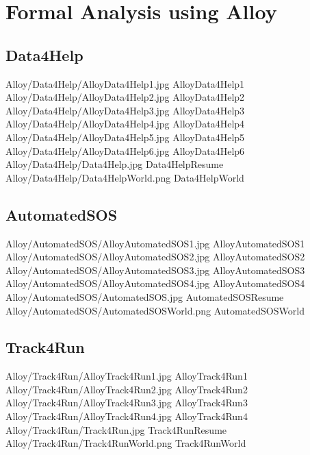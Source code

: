 \documentclass[../rasd.tex]{subfiles}
\begin{document}
\chapter{Formal Analysis using Alloy}
\thispagestyle{fancy}
	\section{Data4Help}
	\image {20cm} {Alloy/Data4Help/AlloyData4Help1.jpg} {} {AlloyData4Help1}
	\image {20cm} {Alloy/Data4Help/AlloyData4Help2.jpg} {} {AlloyData4Help2}
	\image {20cm} {Alloy/Data4Help/AlloyData4Help3.jpg} {} {AlloyData4Help3}
	\image {20cm} {Alloy/Data4Help/AlloyData4Help4.jpg} {} {AlloyData4Help4}
	\image {20cm} {Alloy/Data4Help/AlloyData4Help5.jpg} {} {AlloyData4Help5}
	\image {20cm} {Alloy/Data4Help/AlloyData4Help6.jpg} {} {AlloyData4Help6}
	\image {20cm} {Alloy/Data4Help/Data4Help.jpg} {} {Data4HelpResume}
	\image {20cm} {Alloy/Data4Help/Data4HelpWorld.png} {} {Data4HelpWorld}

	\section{AutomatedSOS}
	\image {20cm} {Alloy/AutomatedSOS/AlloyAutomatedSOS1.jpg} {} {AlloyAutomatedSOS1}
	\image {20cm} {Alloy/AutomatedSOS/AlloyAutomatedSOS2.jpg} {} {AlloyAutomatedSOS2}
	\image {20cm} {Alloy/AutomatedSOS/AlloyAutomatedSOS3.jpg} {} {AlloyAutomatedSOS3}
	\image {20cm} {Alloy/AutomatedSOS/AlloyAutomatedSOS4.jpg} {} {AlloyAutomatedSOS4}
	\image {20cm} {Alloy/AutomatedSOS/AutomatedSOS.jpg} {} {AutomatedSOSResume}
	\image {20cm} {Alloy/AutomatedSOS/AutomatedSOSWorld.png} {} {AutomatedSOSWorld}

	\section{Track4Run}
	\image {20cm} {Alloy/Track4Run/AlloyTrack4Run1.jpg} {} {AlloyTrack4Run1}
	\image {20cm} {Alloy/Track4Run/AlloyTrack4Run2.jpg} {} {AlloyTrack4Run2}
	\image {20cm} {Alloy/Track4Run/AlloyTrack4Run3.jpg} {} {AlloyTrack4Run3}
	\image {20cm} {Alloy/Track4Run/AlloyTrack4Run4.jpg} {} {AlloyTrack4Run4}
	\image {20cm} {Alloy/Track4Run/Track4Run.jpg} {} {Track4RunResume}
	\image {20cm} {Alloy/Track4Run/Track4RunWorld.png} {} {Track4RunWorld}
\end{document}
